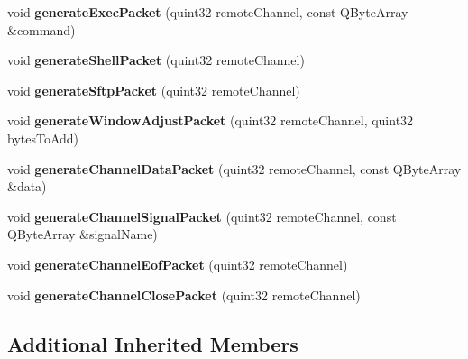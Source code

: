 \begin{DoxyCompactItemize}
void {\bfseries generate\+Exec\+Packet} (quint32 remote\+Channel, const Q\+Byte\+Array \&command)
\item 
\mbox{\label{class_q_ssh_1_1_internal_1_1_ssh_outgoing_packet_ace27533b0e353b49f096a7d1c9fea48b}} 
void {\bfseries generate\+Shell\+Packet} (quint32 remote\+Channel)
\item 
\mbox{\label{class_q_ssh_1_1_internal_1_1_ssh_outgoing_packet_aeb73326257fd994f705c0002670953e7}} 
void {\bfseries generate\+Sftp\+Packet} (quint32 remote\+Channel)
\item 
\mbox{\label{class_q_ssh_1_1_internal_1_1_ssh_outgoing_packet_a9529a2b53f19206dbc58a98e662be6ab}} 
void {\bfseries generate\+Window\+Adjust\+Packet} (quint32 remote\+Channel, quint32 bytes\+To\+Add)
\item 
\mbox{\label{class_q_ssh_1_1_internal_1_1_ssh_outgoing_packet_abac70d097ba3f4406f3a6bd6d1282b2a}} 
void {\bfseries generate\+Channel\+Data\+Packet} (quint32 remote\+Channel, const Q\+Byte\+Array \&data)
\item 
\mbox{\label{class_q_ssh_1_1_internal_1_1_ssh_outgoing_packet_aede079e0239d4ba14f2abb8740420ad7}} 
void {\bfseries generate\+Channel\+Signal\+Packet} (quint32 remote\+Channel, const Q\+Byte\+Array \&signal\+Name)
\item 
\mbox{\label{class_q_ssh_1_1_internal_1_1_ssh_outgoing_packet_acdf563ce18d2c34d38645c55721095e8}} 
void {\bfseries generate\+Channel\+Eof\+Packet} (quint32 remote\+Channel)
\item 
\mbox{\label{class_q_ssh_1_1_internal_1_1_ssh_outgoing_packet_a8bff0c8f0f5bcddc4581550ed52702b6}} 
void {\bfseries generate\+Channel\+Close\+Packet} (quint32 remote\+Channel)
\end{DoxyCompactItemize}
\subsection*{Additional Inherited Members}


